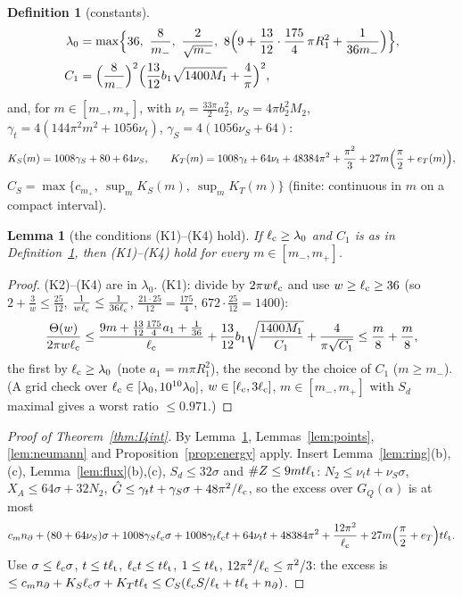 \documentclass[11pt]{article}
\newtheorem{lemma}[theorem]{Lemma}
\theoremstyle{definition}
\newtheorem{definition}[theorem]{Definition}
\theoremstyle{remark}
\newcommand{\lc}{\ell_{\rm c}}
\newcommand{\lt}{\ell_{\rm t}}
\begin{document}
\begin{definition}[constants]\label{def:constants}
\begin{align*}
\lambda_0&=\max\Bigl\{36,\ \frac8{m_-},\ \frac2{\sqrt{m_-}},\ 8\Bigl(9+\frac{13}{12}\cdot\frac{175}4\,\pi R_1^2+\frac1{36m_-}\Bigr)\Bigr\},\\
C_1&=\Bigl(\frac8{m_-}\Bigr)^2\Bigl(\frac{13}{12}b_1\sqrt{1400M_1}+\frac4\pi\Bigr)^2,
\end{align*}
and, for $m\in[m_-,m_+]$, with $\nu_t=\frac{33\pi}2a_2^2$, $\nu_S=4\pi b_2^2M_2$, $\gamma_t=4(144\pi^2m^2+1056\nu_t)$, $\gamma_S=4(1056\nu_S+64)$:
\[
K_S(m)=1008\gamma_S+80+64\nu_S,\qquad K_T(m)=1008\gamma_t+64\nu_t+48384\pi^2+\frac{\pi^2}3+27m\Bigl(\frac\pi2+e_T(m)\Bigr),
\]
$C_S=\max\{c_{m_+},\ \sup_mK_S(m),\ \sup_mK_T(m)\}$ (finite: continuous in $m$ on a compact interval).
\end{definition}

\begin{lemma}[the conditions (K1)--(K4) hold]\label{lem:Kholds}
If $\lc\ge\lambda_0$ and $C_1$ is as in Definition~\ref{def:constants}, then (K1)--(K4) hold for every $m\in[m_-,m_+]$.
\end{lemma}
\begin{proof}
(K2)--(K4) are in $\lambda_0$. (K1): divide by $2\pi w\lc$ and use $w\ge\lc\ge36$ (so $2+\frac3w\le\frac{25}{12}$, $\frac1{w\lc}\le\frac1{36\lc}$, $\frac{21\cdot25}{12}=\frac{175}4$,
$672\cdot\frac{25}{12}=1400$):
\[
\frac{\Theta(w)}{2\pi w\lc}\le\frac{9m+\frac{13}{12}\frac{175}4a_1+\frac1{36}}{\lc}+\frac{13}{12}b_1\sqrt{\frac{1400M_1}{C_1}}+\frac4{\pi\sqrt{C_1}}\le\frac m8+\frac m8,
\]
the first by $\lc\ge\lambda_0$ (note $a_1=m\pi R_1^2$), the second by the choice of $C_1$ ($m\ge m_-$). (A grid check over $\lc\in[\lambda_0,10^{10}\lambda_0]$,
$w\in[\lc,3\lc]$, $m\in[m_-,m_+]$ with $S_d$ maximal gives a worst ratio $\le0.971$.)
\end{proof}

\begin{proof}[Proof of Theorem~\ref{thm:I4int}]
By Lemma~\ref{lem:Kholds}, Lemmas~\ref{lem:points}, \ref{lem:neumann} and Proposition~\ref{prop:energy} apply. Insert Lemma~\ref{lem:ring}(b),(c),
Lemma~\ref{lem:flux}(b),(c), $S_d\le32\sigma$ and $\#Z\le9mt\lt$: $N_2\le\nu_tt+\nu_S\sigma$, $X_A\le64\sigma+32N_2$,
$\hat G\le\gamma_tt+\gamma_S\sigma+48\pi^2/\lc$, so the excess over $G_Q(\alpha)$ is at most
\[
c_mn_\partial+(80+64\nu_S)\sigma+1008\gamma_S\lc\sigma+1008\gamma_t\lc t+64\nu_tt+48384\pi^2+\frac{12\pi^2}{\lc}+27m\Bigl(\frac\pi2+e_T\Bigr)t\lt .
\]
Use $\sigma\le\lc\sigma$, $t\le t\lt$, $\lc t\le t\lt$, $1\le t\lt$, $12\pi^2/\lc\le\pi^2/3$: the excess is $\le c_mn_\partial+K_S\lc\sigma+K_Tt\lt\le C_S(\lc S/\lt+t\lt+n_\partial)$.
\end{proof}
\end{document}
